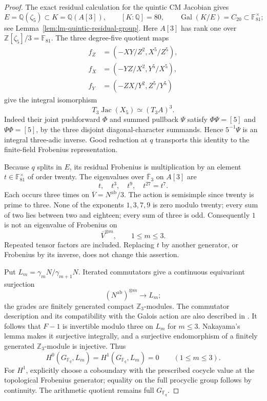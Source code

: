 \begin{proof}
The exact residual calculation for the quintic CM Jacobian gives
\[
 E=\mathbb Q(\zeta_5)\subset K=\mathbb Q(A[3]),\qquad
 [K:\mathbb Q]=80,\qquad
 \operatorname{Gal}(K/E)=C_{20}\subset\mathbb F_{81}^{\times};
\]
see Lemma~\ref{lem:lm-quintic-residual-group}.
Here $A[3]$ has rank one over
$\mathbb Z[\zeta_5]/3=\mathbb F_{81}$.
The three degree-five quotient maps
\[
 \begin{split}
 f_Z&=(-XY/Z^2,X^5/Z^5),\\
 f_X&=(-YZ/X^2,Y^5/X^5),\\
 f_Y&=(-ZX/Y^2,Z^5/Y^5)
 \end{split}
\]
give the integral isomorphism
\[
 T_3\operatorname{Jac}(X_5)\simeq(T_3A)^3.
\]
Indeed their joint pushforward $\Phi$ and summed pullback $\Psi$
satisfy $\Phi\Psi=[5]$ and $\Psi\Phi=[5]$, by the three disjoint
diagonal-character summands.  Hence $5^{-1}\Psi$ is an integral
three-adic inverse.  Good reduction at $q$ transports this identity
to the finite-field Frobenius representation.

Because $q$ splits in $E$, its residual Frobenius is multiplication
by an element $t\in\mathbb F_{81}^{\times}$ of order twenty.
The eigenvalues over $\overline{\mathbb F}_3$ on $A[3]$ are
\[
 t,\quad t^3,\quad t^9,\quad t^{27}=t^7.
\]
Each occurs three times on
$\overline V=N^{\mathrm{ab}}/3$.
The action is semisimple since twenty is prime to three.
None of the exponents $1,3,7,9$ is zero modulo twenty;
every sum of two lies between two and eighteen;
every sum of three is odd.
Consequently $1$ is not an eigenvalue of Frobenius on
\[
 \overline V^{\otimes m},\qquad 1\le m\le3.
\]
Repeated tensor factors are included.  Replacing $t$ by another
generator, or Frobenius by its inverse, does not change this assertion.

Put $L_m=\gamma_mN/\gamma_{m+1}N$.
Iterated commutators give a continuous equivariant surjection
\[
 (N^{\mathrm{ab}})^{\otimes m}\longrightarrow L_m;
\]
the grades are finitely generated compact $\mathbb Z_3$-modules.
The commutator description and its compatibility with the Galois
action are also described in
\citet[Introduction, author pp.~1--2]{DavisPriesWickelgren2024}.
It follows that $F-1$ is invertible modulo three on $L_m$ for
$m\le3$. Nakayama's lemma makes it surjective integrally, and a
surjective endomorphism of a finitely generated $\mathbb Z_3$-module
is injective. Thus
\[
 H^0(G_{\mathbb F_q},L_m)=H^1(G_{\mathbb F_q},L_m)=0
 \qquad(1\le m\le3).
\]
For $H^1$, explicitly choose a coboundary with the prescribed
cocycle value at the topological Frobenius generator; equality on
the full procyclic group follows by continuity.  The arithmetic
quotient remains full $G_{\mathbb F_q}$.


\end{proof}
